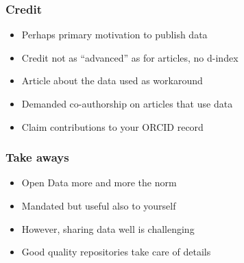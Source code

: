 \documentclass{beamer}
\begin{document}
\begin{frame}
  \frametitle{Credit}
  
  \begin{itemize}
  \item Perhaps primary motivation to publish data
  \item Credit not as ``advanced'' as for articles, no d-index
  \item Article about the data used as workaround
  \item Demanded co-authorship on articles that use data
  \item Claim contributions to your ORCID record
  \end{itemize}
\end{frame}

\begin{frame}
  \frametitle{Take aways}
  
  \begin{itemize}
    \item Open Data more and more the norm
    \item Mandated but useful also to yourself
    \item However, sharing data well is challenging
    \item Good quality repositories take care of details
  \end{itemize}
\end{frame}
\end{document}
